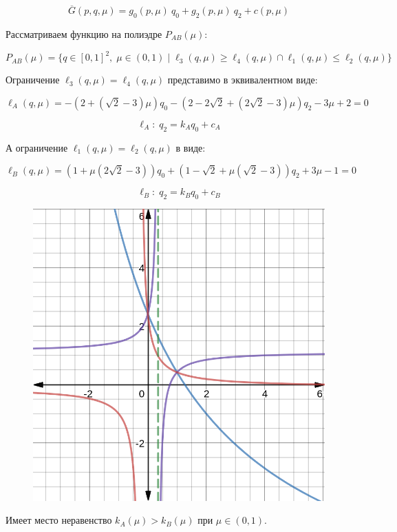 \begin{flushleft}
	$$\overline{G}(p,q,\mu)=g_0(p,\mu) \: q_0+g_2(p,\mu) \: q_2+c(p,\mu)$$
	
	Рассматриваем функцию на полиэдре $P_{AB}(\mu):$
	
	$$P_{AB}(\mu)=
	\{
		q \in [0,1]^2, \; \mu \in (0,1) \; | \;  
		\ell_3(q, \mu) \geqslant \ell_4(q, \mu) \cap
	 	\ell_1(q, \mu) \leqslant \ell_2(q, \mu) 
	\}$$

	Ограничение $\ell_3(q, \mu) = \ell_4(q, \mu)$ представимо в 
	эквивалентном виде:
	
	$$\ell_A(q, \mu)=
	-(2+(\sqrt{2}-3)\mu)q_0
	-(2-2\sqrt{2}+(2\sqrt{2}-3)\mu)q_2
	-3\mu+2=0$$ 	

	$$\ell_A: \; q_2=k_Aq_0+c_A$$
	
	А ограничение $\ell_1(q, \mu) = \ell_2(q, \mu)$ в виде:
	
	$$\ell_B(q, \mu) = 
	(1+\mu(2\sqrt{2}-3))q_0+
	(1-\sqrt{2}+\mu(\sqrt{2}-3))q_2
	+3\mu-1=0$$ 	

	$$\ell_B: \; q_2=k_Bq_0+c_B$$

	
	\begin{figure}[H]
		\centering
  		\includegraphics[scale=0.3]{images/graf_3_10}
  		\caption{}
	\end{figure}	
	
	Имеет место неравенство 
	$k_A(\mu) > k_B(\mu)$ при $\mu \in (0,1)$.
	

\end{flushleft}
